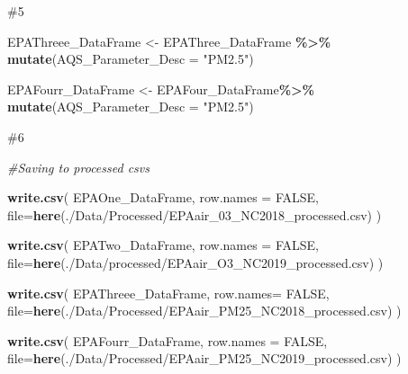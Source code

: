 \documentclass[
]{article}
\newenvironment{Shaded}{\begin{snugshade}}{\end{snugshade}}
\newcommand{\AttributeTok}[1]{\textcolor[rgb]{0.13,0.29,0.53}{#1}}
\newcommand{\CommentTok}[1]{\textcolor[rgb]{0.56,0.35,0.01}{\textit{#1}}}
\newcommand{\ConstantTok}[1]{\textcolor[rgb]{0.56,0.35,0.01}{#1}}
\newcommand{\FunctionTok}[1]{\textcolor[rgb]{0.13,0.29,0.53}{\textbf{#1}}}
\newcommand{\NormalTok}[1]{#1}
\newcommand{\OtherTok}[1]{\textcolor[rgb]{0.56,0.35,0.01}{#1}}
\newcommand{\SpecialCharTok}[1]{\textcolor[rgb]{0.81,0.36,0.00}{\textbf{#1}}}
\newcommand{\StringTok}[1]{\textcolor[rgb]{0.31,0.60,0.02}{#1}}
\begin{document}
\#5

\begin{Shaded}
\begin{Highlighting}[]
\NormalTok{EPAThreee\_DataFrame }\OtherTok{\textless{}{-}}\NormalTok{ EPAThree\_DataFrame }\SpecialCharTok{\%\textgreater{}\%} 
  \FunctionTok{mutate}\NormalTok{(}\AttributeTok{AQS\_Parameter\_Desc =} \StringTok{"PM2.5"}\NormalTok{)}



\NormalTok{EPAFourr\_DataFrame }\OtherTok{\textless{}{-}}\NormalTok{ EPAFour\_DataFrame}\SpecialCharTok{\%\textgreater{}\%} 
  \FunctionTok{mutate}\NormalTok{(}\AttributeTok{AQS\_Parameter\_Desc =} \StringTok{"PM2.5"}\NormalTok{)}
\end{Highlighting}
\end{Shaded}

\#6

\begin{Shaded}
\begin{Highlighting}[]
\CommentTok{\#Saving to processed csvs}

\FunctionTok{write.csv}\NormalTok{(}
\NormalTok{  EPAOne\_DataFrame, }
  \AttributeTok{row.names =} \ConstantTok{FALSE}\NormalTok{, }
  \AttributeTok{file=}\FunctionTok{here}\NormalTok{(}\StringTok{\textquotesingle{}./Data/Processed/EPAair\_03\_NC2018\_processed.csv\textquotesingle{}}\NormalTok{)}
\NormalTok{)}

\FunctionTok{write.csv}\NormalTok{(}
\NormalTok{  EPATwo\_DataFrame, }
  \AttributeTok{row.names =} \ConstantTok{FALSE}\NormalTok{, }
  \AttributeTok{file=}\FunctionTok{here}\NormalTok{(}\StringTok{\textquotesingle{}./Data/processed/EPAair\_O3\_NC2019\_processed.csv\textquotesingle{}}\NormalTok{)}
\NormalTok{)}

\FunctionTok{write.csv}\NormalTok{(}
\NormalTok{  EPAThreee\_DataFrame,}
  \AttributeTok{row.names=} \ConstantTok{FALSE}\NormalTok{, }
  \AttributeTok{file=}\FunctionTok{here}\NormalTok{(}\StringTok{\textquotesingle{}./Data/Processed/EPAair\_PM25\_NC2018\_processed.csv\textquotesingle{}}\NormalTok{)}
\NormalTok{)}

\FunctionTok{write.csv}\NormalTok{(}
\NormalTok{  EPAFourr\_DataFrame,}
  \AttributeTok{row.names =} \ConstantTok{FALSE}\NormalTok{, }
  \AttributeTok{file=}\FunctionTok{here}\NormalTok{(}\StringTok{\textquotesingle{}./Data/Processed/EPAair\_PM25\_NC2019\_processed.csv\textquotesingle{}}\NormalTok{)}
\NormalTok{)}
\end{Highlighting}
\end{Shaded}
\end{document}
